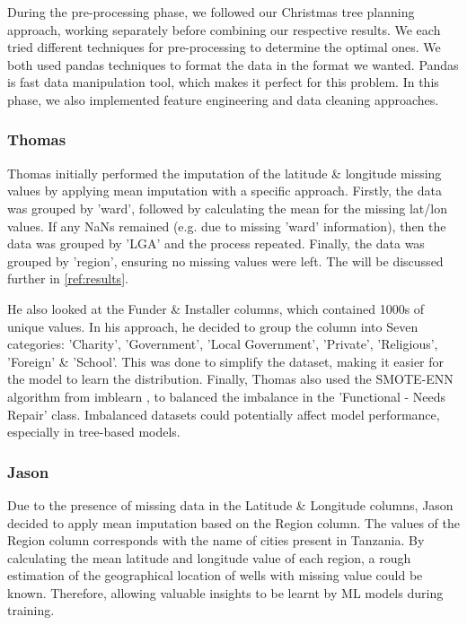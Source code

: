 \documentclass[conference]{IEEEtran}
\begin{document}
During the pre-processing phase, we followed our Christmas tree planning approach, working separately before combining our respective results. We each tried different techniques for pre-processing to determine the optimal ones. We both used pandas techniques to format the data in the format we wanted. Pandas is fast data manipulation tool, which makes it perfect for this problem. In this phase, we also implemented feature engineering and data cleaning approaches.

\subsubsection{Thomas}

Thomas initially performed the imputation of the latitude \& longitude missing values by applying mean imputation with a specific approach. Firstly, the data was grouped by 'ward', followed by calculating the mean for the missing lat/lon values. If any NaNs remained (e.g. due to missing 'ward' information), then the data was grouped by 'LGA' and the process repeated. Finally, the data was grouped by 'region', ensuring no missing values were left. The will be discussed further in \ref{ref:results}.

He also looked at the Funder \& Installer columns, which contained 1000s of unique values. In his approach, he decided to group the column into Seven categories: 'Charity', 'Government', 'Local Government', 'Private', 'Religious', 'Foreign' \& 'School'. This was done to simplify the dataset, making it easier for the model to learn the distribution. Finally, Thomas also used the SMOTE-ENN algorithm from imblearn \cite{smote-enn}, to balanced the imbalance in the 'Functional - Needs Repair' class. Imbalanced datasets could potentially affect model performance, especially in tree-based models.

\subsubsection{Jason}

Due to the presence of missing data in the Latitude \& Longitude columns, Jason decided to apply mean imputation based on the Region column. The values of the Region column corresponds with the name of cities present in Tanzania. By calculating the  mean latitude and longitude value of each region, a rough estimation of the geographical location of wells with missing value could be known. Therefore, allowing valuable insights to be learnt by ML models during training.
\end{document}
